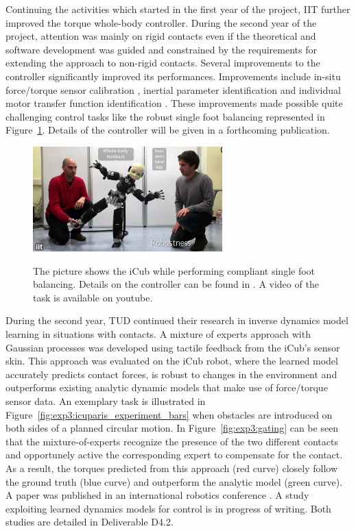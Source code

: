 Continuing the activities which started in the first year of the project, IIT further improved the torque whole-body controller. During the second year of the project, attention was mainly on rigid contacts even if the theoretical and software development was guided and constrained by the requirements for extending the approach to non-rigid contacts. Several improvements to the controller significantly improved its performances. Improvements include in-situ force/torque sensor calibration \cite{Traversaro2015b}, inertial parameter identification \cite{Traversaro2015} and individual motor transfer function identification \cite{Nori2015a}. These improvements made possible quite challenging control tasks like the robust single foot balancing represented in Figure~\ref{fig:footBalancing}. Details of the controller will be given in a forthcoming publication.\\

\begin{figure}[h!]
\centering
{\includegraphics[width=0.65\textwidth]{images/single_foot_balancing.jpg}}
\caption{The picture shows the iCub while performing compliant single foot balancing. Details on the controller can be found in \cite{Nori2015a}. A video of the task is available on youtube\protect\footnotemark.}
\label{fig:footBalancing}
\end{figure}



During the second year, TUD continued their research in inverse dynamics model
learning in situations with contacts. A mixture of experts approach with
Gaussian processes was developed using tactile feedback from the iCub's sensor
skin. This approach was evaluated on the iCub robot, where the learned model
accurately predicts contact forces, is robust to changes in the environment and
outperforms existing analytic dynamic models that make use of force/torque
sensor data. 
An exemplary task is illustrated in Figure~\ref{fig:exp3:icuparis_experiment_bars} 
when obstacles are introduced on both sides of a planned circular motion.
In Figure~\ref{fig:exp3:gating} can be seen that the mixture-of-experts recognize the presence of the two different contacts and opportunely active the corresponding expert to compensate for the contact.
As a result, the torques predicted from this approach (red curve) closely follow the ground truth (blue curve) and outperform the analytic model (green curve).
A paper was published in an international robotics conference
\cite{Calandra_ICRA15}. A study exploiting learned dynamics models
for control is in progress of writing. Both studies are detailed in Deliverable
D4.2.\\

